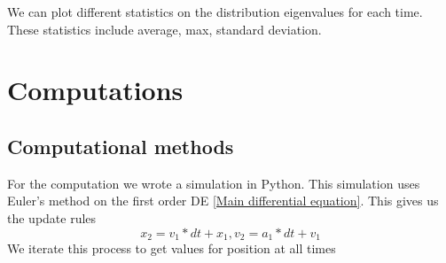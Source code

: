 We can plot different statistics on the distribution eigenvalues for each time. These statistics include average, max, standard deviation.\\



\chapter{Computations}

\section{Computational methods}

For the computation we wrote a simulation in Python. This simulation uses Euler's method on the first order DE \ref{Main differential equation}. This gives us the update rules
\[x_2 = v_1 * dt + x_1, v_2 = a_1 * dt + v_1\]
We iterate this process to get values for position at all times\\

